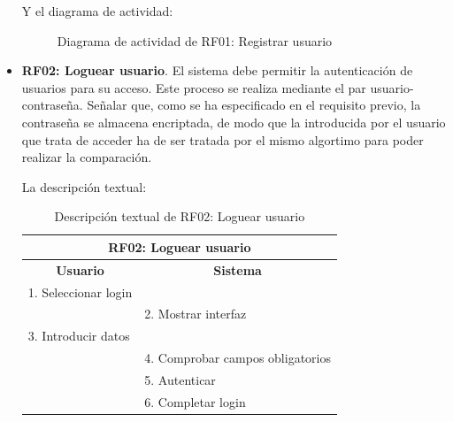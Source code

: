 \begin{itemize}
	\FloatBarrier
	Y el diagrama de actividad:
	\begin{figure}[!htb]
		\centering
		\caption{Diagrama de actividad de RF01: Registrar usuario}
		\label{fig:diagramaActividad_RF01}
	\end{figure}
	 
	\item \textbf{RF02: Loguear usuario}. El sistema debe permitir la autenticación de usuarios para su acceso. Este proceso se realiza mediante el par usuario-contraseña. Señalar que, como se ha especificado en el requisito previo, la contraseña se almacena encriptada, de modo que la introducida por el usuario que trata de acceder ha de ser tratada por el mismo algortimo para poder realizar la comparación.
	
	La descripción textual:
	\begin{table}[h]
		\centering	
		\begin{tabular}{|l|l|}
			\hline
			\multicolumn{2}{|c|}{\textbf{RF02: Loguear usuario}} \\ \hline
			\multicolumn{1}{|c|}{\textbf{Usuario}} & \multicolumn{1}{c|}{\textbf{Sistema}} \\ \hline
			1. Seleccionar login &\\ \hline
			& 2. Mostrar interfaz \\ \hline
			3. Introducir datos &\\ \hline
			& 4. Comprobar campos obligatorios \\ \hline
			& 5. Autenticar \\ \hline
			& 6. Completar login\\ \hline
		\end{tabular}
		\caption{Descripción textual de RF02: Loguear usuario}
		\label{tab:tablaDescTextualRF02}
	\end{table}
	

\end{itemize}
